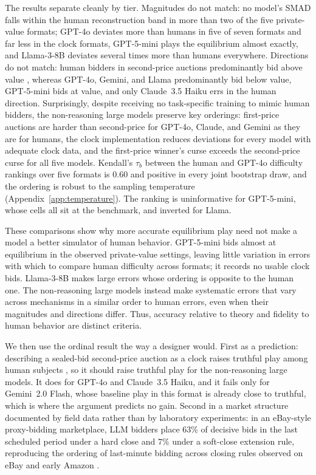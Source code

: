 \documentclass{article} %
\newif\ifmarkrev
\newcommand{\rev}[1]{\ifmarkrev\begingroup\color{red}#1\endgroup\else#1\fi}
\begin{document}
\rev{The results separate cleanly by tier.
Magnitudes do not match: no model's SMAD falls within the human reconstruction band in more than two of the five private-value formats; GPT-4o deviates more than humans in five of seven formats and far less in the clock formats, GPT-5-mini plays the equilibrium almost exactly, and Llama-3-8B deviates several times more than humans everywhere.
Directions do not match: human bidders in second-price auctions predominantly bid above value \citep{kagel1993independent, li2017obviously}, whereas GPT-4o, Gemini, and Llama predominantly bid below value, GPT-5-mini bids at value, and only Claude~3.5 Haiku errs in the human direction.
Surprisingly, despite receiving no task-specific training to mimic human bidders, the non-reasoning large models preserve key orderings: first-price auctions are harder than second-price for GPT-4o, Claude, and Gemini as they are for humans, the clock implementation reduces deviations for every model with adequate clock data, and the first-price winner's curse exceeds the second-price curse for all five models.
Kendall's $\tau_b$ between the human and GPT-4o difficulty rankings over five formats is $0.60$ and positive in every joint bootstrap draw, and the ordering is robust to the sampling temperature (Appendix~\ref{app:temperature}).
The ranking is uninformative for GPT-5-mini, whose cells all sit at the benchmark, and inverted for Llama.}

\rev{These comparisons show why more accurate equilibrium play need not make a model a better simulator of human behavior.
GPT-5-mini bids almost at equilibrium in the observed private-value settings, leaving little variation in errors with which to compare human difficulty across formats; it records no usable clock bids.
Llama-3-8B makes large errors whose ordering is opposite to the human one.
The non-reasoning large models instead make systematic errors that vary across mechanisms in a similar order to human errors, even when their magnitudes and directions differ.
Thus, accuracy relative to theory and fidelity to human behavior are distinct criteria.}

\rev{We then use the ordinal result the way a designer would.
First as a prediction: describing a sealed-bid second-price auction as a clock raises truthful play among human subjects \citep{breitmoser2022obviousness}, so it should raise truthful play for the non-reasoning large models.
It does for GPT-4o and Claude~3.5 Haiku, and it fails only for Gemini~2.0 Flash, whose baseline play in this format is already close to truthful, which is where the argument predicts no gain.
Second in a market structure documented by field data rather than by laboratory experiments: in an eBay-style proxy-bidding marketplace, LLM bidders place $63\%$ of decisive bids in the last scheduled period under a hard close and $7\%$ under a soft-close extension rule, reproducing the ordering of last-minute bidding across closing rules observed on eBay and early Amazon \citep{roth2002last, ockenfels2006late}.}
\end{document}
